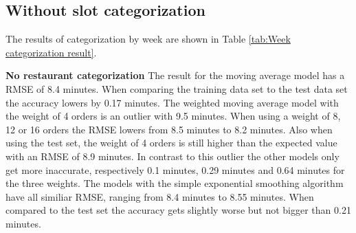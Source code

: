 \subsection{Without slot categorization}
The results of categorization by week are shown in Table \ref{tab:Week categorization result}.
\begin{table}[h]
\centering
\caption{Week categorization without slots}
\label{tab:Week categorization result}
\end{table}
\newline\newline\textbf{No restaurant categorization}\newline
The result for the moving average model has a RMSE of 8.4 minutes. When comparing the training data set to the test data set the accuracy lowers by 0.17 minutes. The weighted moving average model with the weight of 4 orders is an outlier with 9.5 minutes. When using a weight of 8, 12 or 16 orders the RMSE lowers from 8.5 minutes to 8.2 minutes. Also when using the test set, the weight of 4 orders is still higher than the expected value with an RMSE of 8.9 minutes. In contrast to this outlier the other models only get more inaccurate, respectively 0.1 minutes, 0.29 minutes and 0.64 minutes for the three weights. The models with the simple exponential smoothing algorithm have all similiar RMSE, ranging from 8.4 minutes to 8.55 minutes. When compared to the test set the accuracy gets slightly worse but not bigger than 0.21 minutes.\newline
